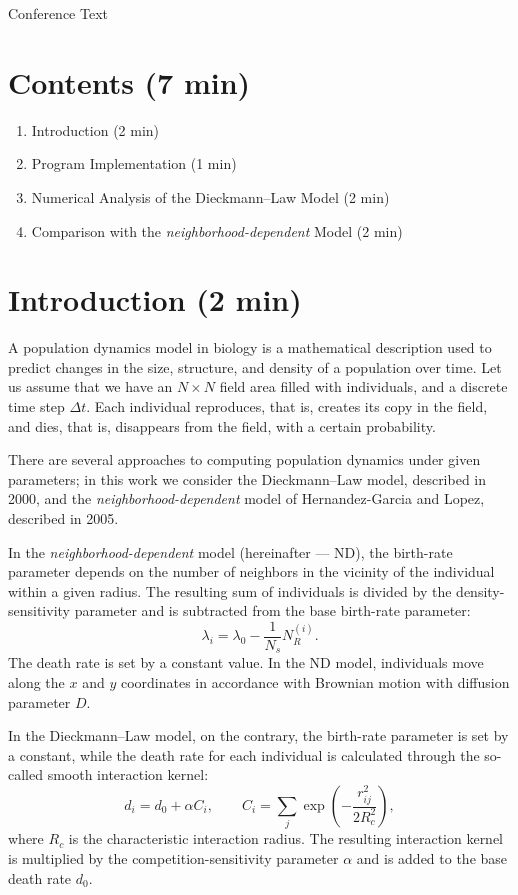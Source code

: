 \documentclass[12pt,a4paper]{article}
\begin{document}
\begin{center}
    {\LARGE Conference Text}
\end{center}

\section*{Contents (7 min)}
\begin{enumerate}
    \item Introduction (2 min)
    \item Program Implementation (1 min)
    \item Numerical Analysis of the Dieckmann--Law Model (2 min)
    \item Comparison with the \textit{neighborhood-dependent} Model (2 min)
\end{enumerate}

\section*{Introduction (2 min)}
A population dynamics model in biology is a mathematical description used to predict changes in the size, structure, and density of a population over time. Let us assume that we have an $N \times N$ field area filled with individuals, and a discrete time step $\Delta t$. Each individual reproduces, that is, creates its copy in the field, and dies, that is, disappears from the field, with a certain probability.

There are several approaches to computing population dynamics under given parameters; in this work we consider the Dieckmann--Law model, described in 2000, and the \textit{neighborhood-dependent} model of Hernandez-Garcia and Lopez, described in 2005.

In the \textit{neighborhood-dependent} model (hereinafter --- ND), the birth-rate parameter depends on the number of neighbors in the vicinity of the individual within a given radius. The resulting sum of individuals is divided by the density-sensitivity parameter and is subtracted from the base birth-rate parameter:
\[
\lambda_i = \lambda_0 - \frac{1}{N_s} N_R^{(i)}.
\]
The death rate is set by a constant value. In the ND model, individuals move along the $x$ and $y$ coordinates in accordance with Brownian motion with diffusion parameter $D$.

In the Dieckmann--Law model, on the contrary, the birth-rate parameter is set by a constant, while the death rate for each individual is calculated through the so-called smooth interaction kernel:
\[
d_i = d_0 + \alpha C_i,
\qquad
C_i = \sum_j \exp\left(-\frac{r_{ij}^2}{2R_c^2}\right),
\]
where $R_c$ is the characteristic interaction radius. The resulting interaction kernel is multiplied by the competition-sensitivity parameter $\alpha$ and is added to the base death rate $d_0$.
\end{document}
